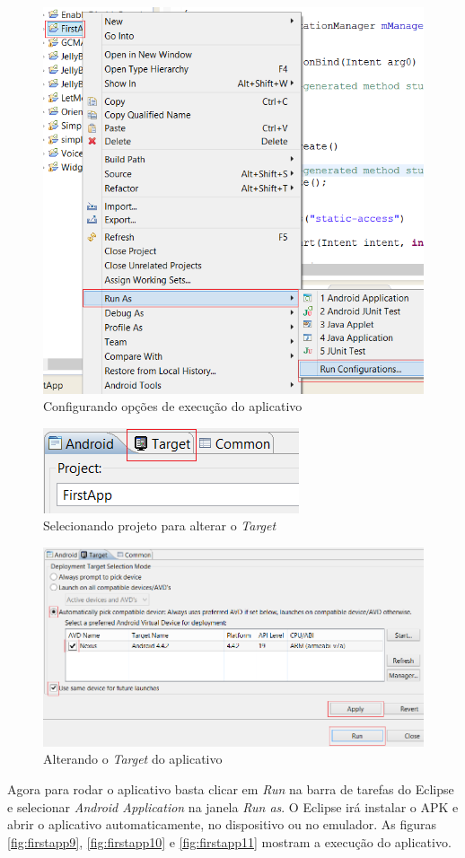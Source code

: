 \documentclass[a4paper,12pt,brazil,oneside]{book}
\begin{document}
\begin{singlespace}
\begin{figure}[H]
  \centering
  \includegraphics[width=.7\textwidth]{figuras/emulador/AddEmulador2.png}
  \caption{Configurando opções de execução do aplicativo}
  \label{fig:AddEmulador2}
\end{figure}

\begin{figure}[H]
  \centering
  \includegraphics[width=.4\textwidth]{figuras/emulador/AddEmulador3.png}
  \caption{Selecionando projeto para alterar o \emph{Target}}
  \label{fig:AddEmulador3}
\end{figure}

\begin{figure}[H]
  \centering
  \includegraphics[width=.7\textwidth]{figuras/emulador/AddEmulador4.png}
  \caption{Alterando o \emph{Target} do aplicativo}
  \label{fig:AddEmulador4}
\end{figure}


Agora para rodar o aplicativo basta clicar em \emph{Run} na barra de tarefas do Eclipse e selecionar \textit{Android Application} na janela \emph{Run as}. O Eclipse irá instalar o APK e abrir o aplicativo automaticamente, no dispositivo ou no emulador. As figuras \autoref{fig:firstapp9}, \autoref{fig:firstapp10} e \autoref{fig:firstapp11} mostram a execução do aplicativo.


\end{singlespace}
\end{document}
